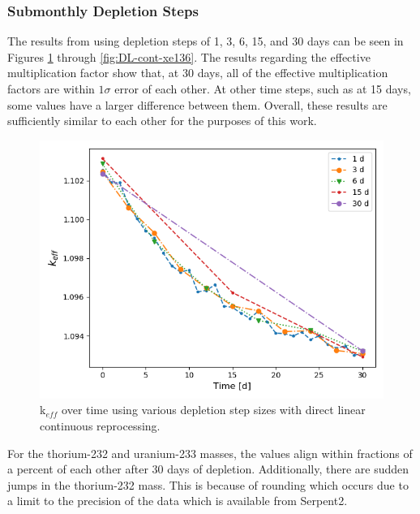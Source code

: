 \subsubsection{Submonthly Depletion Steps}

The results from using depletion steps of 1, 3, 6, 15, and 30 days can be seen in Figures \ref{fig:DL-cont-k} through \ref{fig:DL-cont-xe136}. The results regarding the effective multiplication factor show that, at 30 days, all of the effective multiplication factors are within $1\sigma$ error of each other. At other time steps, such as at 15 days, some values have a larger difference between them. Overall, these results are sufficiently similar to each other for the purposes of this work.

\begin{figure}[H]
  \centering
  \includegraphics[scale=0.7]{images/DL_NSTEP_keff.png}
  \caption{k$_{eff}$ over time using various depletion step sizes with direct linear continuous reprocessing.}
   \label{fig:DL-cont-k}
\end{figure}

For the thorium-232 and uranium-233 masses, the values align within fractions of a percent of each other after 30 days of depletion. Additionally, there are sudden jumps in the thorium-232 mass. This is because of rounding which occurs due to a limit to the precision of the data which is available from Serpent2.

